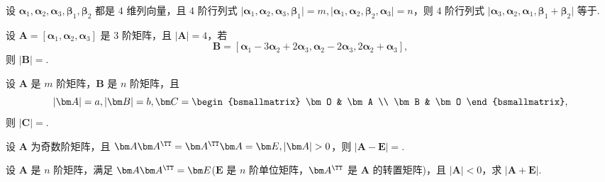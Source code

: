 	\begin{titwo}
		设 $\bm \alpha_{1},\bm \alpha_{2},\bm \alpha_{3},\bm \beta_{1},\bm \beta_{2}$ 都是 $4$ 维列向量，且 $4$ 阶行列式 $\bigl|\bm \alpha_{1},\bm \alpha_{2},\bm \alpha_{3},\bm \beta_{1}\bigr| = m,\bigl|\bm \alpha_{1},\bm \alpha_{2},\bm \beta_{2},\bm \alpha_{3}\bigr| = n$，则 $4$ 阶行列式 $\bigl|\bm \alpha_{3},\bm \alpha_{2},\bm \alpha_{1},\bm \beta_{1} + \bm \beta_{2}\bigr|$ 等于\kuo.

	\end{titwo}

	\begin{titwo}
		设 $\bm A = [\bm \alpha_{1},\bm \alpha_{2},\bm \alpha_{3}]$ 是 $3$ 阶矩阵，且 $|\bm A| = 4$，若
		\[
			\bm B = [\bm \alpha_{1} - 3 \bm \alpha_{2} + 2 \bm \alpha_{3}, \bm \alpha_{2} - 2 \bm \alpha_{3}, 2 \bm \alpha_{2} + \bm \alpha_{3}],
		\]
		则 $|\bm B| = $\htwo.
	\end{titwo}

	\begin{titwo}
		设 $\bm A$ 是 $m$ 阶矩阵，$\bm B$ 是 $n$ 阶矩阵，且
		\[
			|\bm A| = a, |\bm B| = b, \bm C = \begin{bsmallmatrix}
				\bm O & \bm A \\
				\bm B & \bm O
			\end{bsmallmatrix},
		\]
		则 $|\bm C| = $\htwo.
	\end{titwo}

	\begin{titwo}
		设 $\bm A$ 为奇数阶矩阵，且 $\bm A \bm A^{\TT} = \bm A^{\TT} \bm A = \bm E, |\bm A| > 0$，则 $|\bm A - \bm E| = $\htwo.
	\end{titwo}

	\begin{titwo}
		设 $\bm A$ 是 $n$ 阶矩阵，满足 $\bm A \bm A^{\TT} = \bm E$($\bm E$ 是 $n$ 阶单位矩阵，$\bm A^{\TT}$ 是 $\bm A$ 的转置矩阵)，且 $|\bm A| < 0$，求 $|\bm A + \bm E|$.
	\end{titwo}